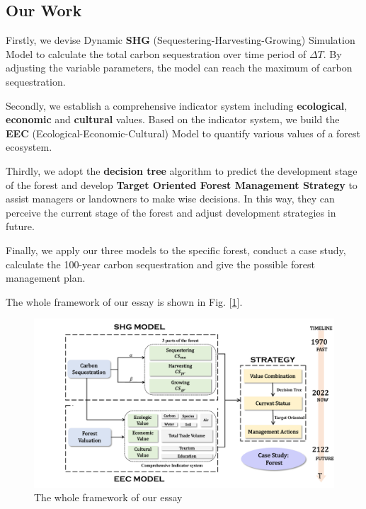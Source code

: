 \subsection{Our Work}

Firstly, we devise Dynamic \textbf{SHG} (Sequestering-Harvesting-Growing) Simulation Model to calculate the total carbon sequestration over time period of $\Delta T$. By adjusting the variable parameters, the model can reach the maximum of carbon sequestration.

Secondly, we establish a comprehensive indicator system including \textbf{ecological}, \textbf{economic} and \textbf{cultural} values. Based on the indicator system, we build the \textbf{EEC} (Ecological-Economic-Cultural) Model to quantify various values of a forest ecosystem. 

Thirdly, we adopt the \textbf{decision tree} algorithm to predict the development stage of the forest and develop \textbf{Target Oriented Forest Management Strategy} to assist managers or landowners to make wise decisions. In this way, they can perceive the current stage of the forest and adjust development strategies in future.

Finally, we apply our three models to the specific forest, conduct a case study, calculate the 100-year carbon sequestration and give the possible forest management plan.

The whole framework of our essay is shown in Fig. [\ref{The whole framework}].
\begin{figure}[H]
\centering
\setlength{\abovecaptionskip}{0.cm}
\includegraphics[width = 16.5cm]{mcmthesis-demo/figures/Our Work.pdf}
\caption{The whole framework of our essay}
\label{The whole framework}
\end{figure}